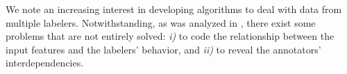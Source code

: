 \documentclass[journal]{IEEEtran}
\begin{document}

We note an increasing interest in developing algorithms to deal with data from multiple labelers. Notwithstanding, as was analyzed in \cite{g2019machine}, there exist some problems that are not entirely solved: \textit{i)} to code the relationship between the input features and the labelers' behavior, and \textit{ii)} to reveal the annotators' interdependencies. 
\end{document}
